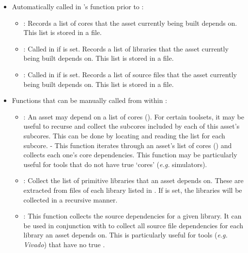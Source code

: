 \begin{itemize}
\item Automatically called in 's  function prior to :
\begin{itemize}
\item {}: Records a list of cores that the asset currently being built depends on. This list is stored in a  file.
\item {}: Called in  if  is set. Records a list of libraries that the asset currently being built depends on. This list is stored in a  file.
\item {}: Called in  if  is set. Records a list of source files that the asset currently being built depends on. This list is stored in a  file.
\end{itemize}

\item Functions that can be manually called from within :
\begin{itemize}
\item {}: An asset may depend on a list of cores (). For certain toolsets, it may be useful to recurse and collect the subcores included by each of this asset's subcores. This can be done by locating and reading the  list for each subcore.
	\subitem - This function iterates through an asset's list of cores () and collects each
	\subitem one's core dependencies. This function may be particularly useful for tools that do not have true
	\subitem `cores' (\textit{e.g.} simulators).
\item {}: Collect the list of primitive libraries that an asset depends on. These are extracted from  files of each library listed in . If  is set, the libraries will be collected in a recursive manner.
\item {}: This function collects the source dependencies for a given library. It can be used in conjunction with  to collect all source file dependencies for each library an asset depends on. This is particularly useful for tools (\textit{e.g. Vivado}) that have no true .
\end{itemize}
\end{itemize}

